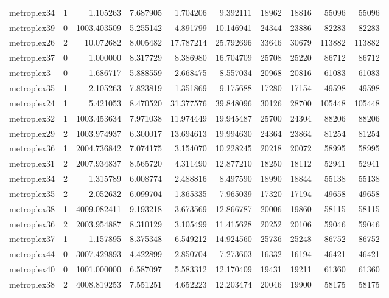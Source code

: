 \begin{longtable}{|l|r|r|r|r|r|r|r|r|r|}
metroplex34 & 1 & 1.105263 & 7.687905 & 1.704206 & 9.392111 & 18962 & 18816 & 55096 & 55096 \\
metroplex39 & 0 & 1003.403509 & 5.255142 & 4.891799 & 10.146941 & 24344 & 23886 & 82283 & 82283 \\
metroplex26 & 2 & 10.072682 & 8.005482 & 17.787214 & 25.792696 & 33646 & 30679 & 113882 & 113882 \\
metroplex37 & 0 & 1.000000 & 8.317729 & 8.386980 & 16.704709 & 25708 & 25220 & 86712 & 86712 \\
metroplex3 & 0 & 1.686717 & 5.888559 & 2.668475 & 8.557034 & 20968 & 20816 & 61083 & 61083 \\
metroplex35 & 1 & 2.105263 & 7.823819 & 1.351869 & 9.175688 & 17280 & 17154 & 49598 & 49598 \\
metroplex24 & 1 & 5.421053 & 8.470520 & 31.377576 & 39.848096 & 30126 & 28700 & 105448 & 105448 \\
metroplex32 & 1 & 1003.453634 & 7.971038 & 11.974449 & 19.945487 & 25700 & 24304 & 88206 & 88206 \\
metroplex29 & 2 & 1003.974937 & 6.300017 & 13.694613 & 19.994630 & 24364 & 23864 & 81254 & 81254 \\
metroplex36 & 1 & 2004.736842 & 7.074175 & 3.154070 & 10.228245 & 20218 & 20072 & 58995 & 58995 \\
metroplex31 & 2 & 2007.934837 & 8.565720 & 4.311490 & 12.877210 & 18250 & 18112 & 52941 & 52941 \\
metroplex34 & 2 & 1.315789 & 6.008774 & 2.488816 & 8.497590 & 18990 & 18844 & 55138 & 55138 \\
metroplex35 & 2 & 2.052632 & 6.099704 & 1.865335 & 7.965039 & 17320 & 17194 & 49658 & 49658 \\
metroplex38 & 1 & 4009.082411 & 9.193218 & 3.673569 & 12.866787 & 20006 & 19860 & 58115 & 58115 \\
metroplex36 & 2 & 2003.954887 & 8.310129 & 3.105499 & 11.415628 & 20252 & 20106 & 59046 & 59046 \\
metroplex37 & 1 & 1.157895 & 8.375348 & 6.549212 & 14.924560 & 25736 & 25248 & 86752 & 86752 \\
metroplex44 & 0 & 3007.429893 & 4.422899 & 2.850704 & 7.273603 & 16332 & 16194 & 46421 & 46421 \\
metroplex40 & 0 & 1001.000000 & 6.587097 & 5.583312 & 12.170409 & 19431 & 19211 & 61360 & 61360 \\
metroplex38 & 2 & 4008.819253 & 7.551251 & 4.652223 & 12.203474 & 20046 & 19900 & 58175 & 58175 \\

\end{longtable}
